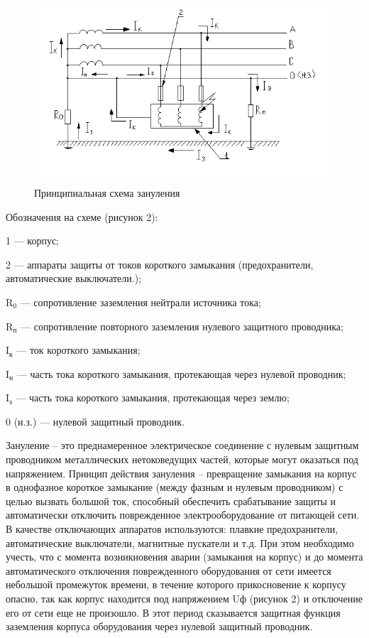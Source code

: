 \begin{figure}
  	\centering
  	\includegraphics[width=1\textwidth]{images/ot-zanul.png}
  	\caption{Принципиальная схема зануления}
    \label{fig:ot-zanul}
\end{figure}

Обозначения на схеме (рисунок 2):

1 --- корпус;

2 --- аппараты защиты от токов короткого замыкания (предохранители, автоматические выключатели.);

\( \text{R}_{\text{0}} \) --- сопротивление заземления нейтрали источника тока;

\( \text{R}_{\text{п}} \) --- сопротивление повторного заземления нулевого защитного проводника;

\( \text{I}_{\text{к}} \) --- ток короткого замыкания;

\( \text{I}_{\text{н}} \) --- часть тока короткого замыкания, протекающая через нулевой проводник;

\( \text{I}_{\text{з}} \) --- часть тока короткого замыкания, протекающая через землю;

0 (н.з.) --- нулевой защитный проводник.

Зануление – это преднамеренное электрическое соединение с нулевым защитным проводником металлических нетоковедущих частей, которые могут оказаться под напряжением.
Принцип действия зануления – превращение замыкания на корпус в однофазное короткое замыкание (между фазным и нулевым проводником) с целью вызвать большой ток, способный обеспечить срабатывание защиты и автоматически отключить поврежденное электрооборудование от питающей сети. В качестве отключающих аппаратов используются: плавкие предохранители, автоматические выключатели, магнитные пускатели и т.д. При этом необходимо учесть, что с момента возникновения аварии (замыкания на корпус) и до момента автоматического отключения поврежденного оборудования от сети имеется небольшой промежуток времени, в течение которого прикосновение к корпусу опасно, так как корпус находится под напряжением Uф  (рисунок 2)  и отключение его от сети еще не произошло. В этот период сказывается защитная функция заземления корпуса оборудования через нулевой защитный проводник.


